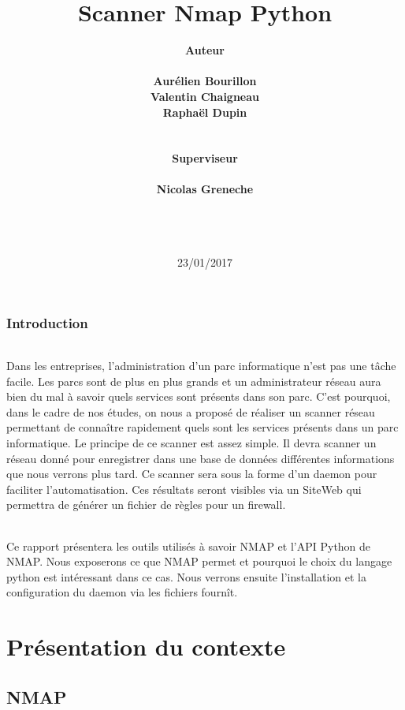 \documentclass[12pt]{report}
\title{Scanner Nmap Python}
\author {\bf Auteur\\\\
		Aurélien Bourillon\\
		Valentin Chaigneau\\
		Raphaël Dupin\\\\\\
		\bf Superviseur\\\\
		Nicolas Greneche\\\\\\\\}
\date{23/01/2017}
\begin{document}
\maketitle
\section*{Introduction}
	\paragraph{}
	Dans les entreprises, l'administration d'un parc informatique n'est pas une tâche facile. Les parcs sont de plus en plus grands et un administrateur réseau aura bien du mal à savoir quels services sont présents dans son parc. C'est pourquoi, dans le cadre de nos études, on nous a proposé de réaliser un scanner réseau permettant de connaître rapidement quels sont les services présents dans un parc informatique.	Le principe de ce scanner est assez simple. Il devra scanner un réseau donné pour enregistrer dans une base de données différentes informations que nous verrons plus tard. Ce scanner sera sous la forme d'un daemon pour faciliter l'automatisation. Ces résultats seront visibles via un SiteWeb qui permettra de générer un fichier de règles pour un firewall.
	\paragraph{}
	Ce rapport présentera les outils utilisés à savoir NMAP et l'API Python de NMAP. Nous exposerons ce que NMAP permet et pourquoi le choix du langage python est intéressant dans ce cas. Nous verrons ensuite l'installation et la configuration du daemon via les fichiers fournît. 
\tableofcontents
\part{Présentation du contexte}
	\chapter{NMAP}
\end{document}

